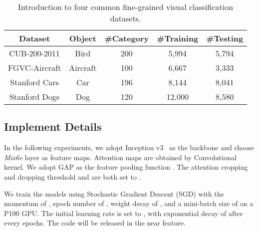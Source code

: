 \documentclass[10pt,twocolumn,letterpaper]{article}
\begin{document}
\begin{table}[h]
    \begin{center}
        \scriptsize
        \begin{tabular}{c|c|c|c|c}
            \hline
            Dataset & Object & \#Category & \#Training & \#Testing\\
            \hline
            CUB-200-2011 & Bird & 200 & 5,994 & 5,794  \\
            \hline
            FGVC-Aircraft & Aircraft & 100 & 6,667 & 3,333\\
            \hline
            Stanford Cars & Car & 196 & 8,144 & 8,041 \\
            \hline
            Stanford Dogs & Dog & 120 & 12,000 & 8,580 \\
            \hline
        \end{tabular}
    \end{center}
    \caption {Introduction to four common fine-grained visual classification datasets.}
    \label{tab:dataset}
\end{table}


\subsection{Implement Details}
In the following experiments, we adopt Inception v3~\cite{inception} as the backbone and choose \textit{Mix6e} layer as feature maps. Attention maps are obtained by  Convolutional kernel. We adopt GAP as the feature pooling function . The attention cropping and dropping threshold  and  are both set to .

We train the models using Stochastic Gradient Descent (SGD) with the momentum of , epoch number of , weight decay of , and a mini-batch size of  on a P100 GPU. The initial learning rate is set to , with exponential decay of  after every  epochs. The code will be released in the near feature.
\end{document}
